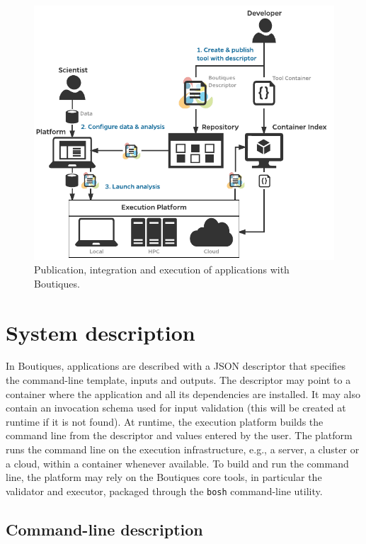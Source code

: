 \documentclass[a4paper,num-refs]{oup-contemporary}
\newcommand{\boutiques}{Boutiques\xspace}
\begin{document}
\begin{figure}
  \includegraphics[width=\columnwidth]{boutiquesfig1.pdf}
  \caption{Publication, integration and execution of applications with \boutiques.}
  \label{fig:diagram}
\end{figure}

\section{System description}
\label{sec:system}

In \boutiques, applications are described with a JSON descriptor that
specifies the command-line template, inputs and outputs. The
descriptor may point to a container where the application and all its
dependencies are installed. It may also contain an invocation schema
used for input validation (this will be created at runtime if it is
not found). At runtime, the execution platform builds the command line
from the descriptor and values entered by the user. The platform runs
the command line on the execution infrastructure, e.g., a server, a
cluster or a cloud, within a container whenever available. To build
and run the command line, the platform may rely on the \boutiques core
tools, in particular the validator and executor, packaged through the
\texttt{bosh} command-line utility.

\subsection{Command-line description}
\end{document}
